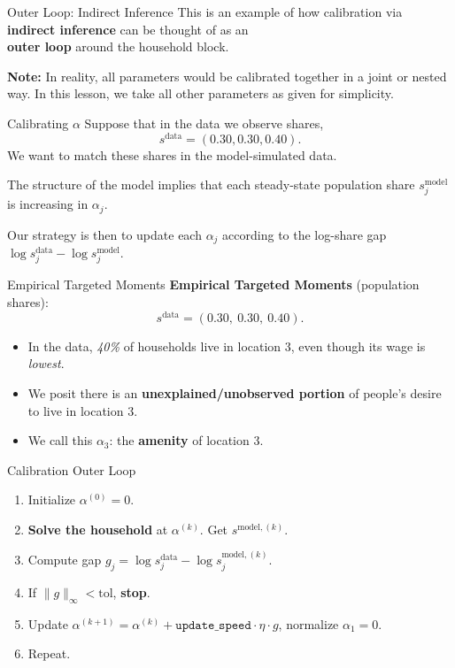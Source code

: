 \documentclass[10pt,aspectratio=169]{beamer}
\begin{document}
\begin{frame}{Outer Loop: Indirect Inference}
  This is an example of how calibration via \textbf{indirect inference} can be thought of as an\\ \textbf{outer loop} around the household block.

  \textbf{Note:} In reality, all parameters would be calibrated together in a joint or nested way. In this lesson, we take all other parameters as given for simplicity.
\end{frame}

\begin{frame}{Calibrating $\alpha$}
  Suppose that in the data we observe shares,
  \[
    s^\text{data} = (0.30, 0.30, 0.40).
  \]
  We want to match these shares in the model-simulated data.

  The structure of the model implies that each steady-state population share $s_j^\text{model}$ is increasing in $\alpha_j$.

  Our strategy is then to update each $\alpha_j$ according to the log-share gap $\log s_j^{\text{data}} - \log s_j^{\text{model}}$.
\end{frame}

\begin{frame}{Empirical Targeted Moments}
  \textbf{Empirical Targeted Moments} (population shares):
  \[
  s^{\text{data}} = (0.30,\ 0.30,\ 0.40).
  \]

  \begin{itemize}
    \item In the data, \emph{40\%} of households live in location 3, even though its wage is \emph{lowest}.
    \item We posit there is an \textbf{unexplained/unobserved portion} of people's desire to live in location 3.
    \item We call this $\alpha_3$: the \textbf{amenity} of location 3.
  \end{itemize}
\end{frame}

\begin{frame}{Calibration Outer Loop}
  \begin{enumerate}
    \item Initialize $\alpha^{(0)} = 0$.
    \item \textbf{Solve the household} at $\alpha^{(k)}$. Get $s^{\text{model}, (k)}$.
    \item Compute gap $g_j = \log s_j^{\text{data}} - \log s_j^{\text{model}, (k)}$.
    \item If $\| g \|_\infty < \text{tol}$, \textbf{stop}.
    \item Update $\alpha^{(k+1)} = \alpha^{(k)} + \texttt{update\_speed} \cdot \eta \cdot g$, normalize $\alpha_1 = 0$.
    \item Repeat.
  \end{enumerate}
\end{frame}
\end{document}
